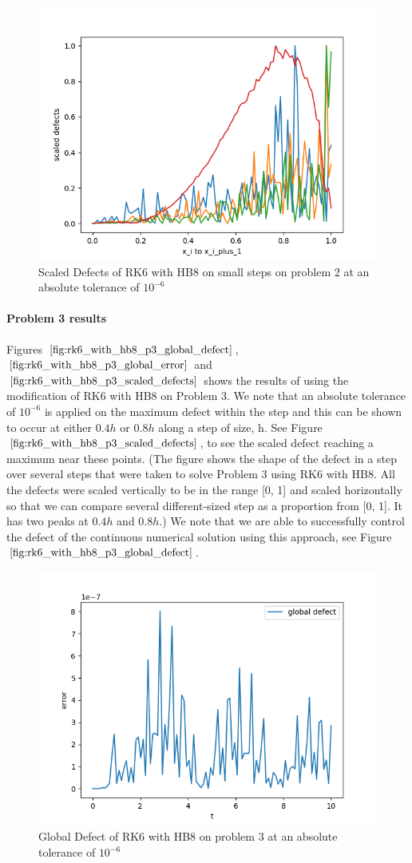 \documentclass{article}
\begin{document}
\begin{figure}[H]
\centering
\includegraphics[width=0.7\linewidth]{./figures/rk6_with_hb8_p2_scaled_defects_small_steps}
\caption{Scaled Defects of RK6 with HB8 on small steps on problem 2 at an absolute tolerance of $10^{-6}$}
\label{fig:rk6_with_hb8_p2_scaled_defects_small_steps}
\end{figure}

\paragraph{Problem 3 results}
Figures $\ref{fig:rk6_with_hb8_p3_global_defect}$, $\ref{fig:rk6_with_hb8_p3_global_error}$ and $\ref{fig:rk6_with_hb8_p3_scaled_defects}$ shows the results of using the modification of RK6 with HB8 on Problem 3. 
We note that an absolute tolerance of $10^{-6}$ is applied on the maximum defect within the step and this can be shown to occur at either $0.4h$ or $0.8h$ along a step of size, h. See Figure $\ref{fig:rk6_with_hb8_p3_scaled_defects}$, to see the scaled defect reaching a maximum near these points. (The figure shows the shape of the defect in a step over several steps that were taken to solve Problem 3 using RK6 with HB8. All the defects were scaled vertically to be in the range [0, 1] and scaled horizontally so that we can compare several different-sized step as a proportion from [0, 1]. It has two peaks at $0.4h$ and $0.8h$.) We note that we are able to successfully control the defect of the continuous numerical solution using this approach, see Figure $\ref{fig:rk6_with_hb8_p3_global_defect}$. 
 

\begin{figure}[H]
\centering
\includegraphics[width=0.7\linewidth]{./figures/rk6_with_hb8_p3_global_defect}
\caption{Global Defect of RK6 with HB8 on problem 3 at an absolute tolerance of $10^{-6}$}
\label{fig:rk6_with_hb8_p3_global_defect}
\end{figure}
\end{document}
